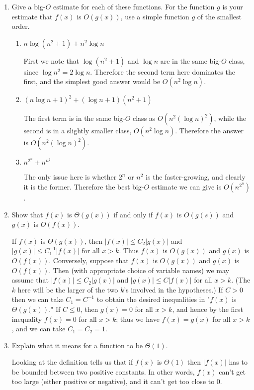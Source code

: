 \documentclass[11pt]{article}
\begin{document}
\begin{enumerate}[label=\textbf{\arabic*.}]
	\item Give a big-$O$ estimate for each of these functions. For the function $g$ is your estimate that $f(x)$ is $O(g(x))$, use a simple function $g$ of the smallest order.
	
	\begin{enumerate}[label=\textbf{\alph*)}]
		\item $n \log(n^2 + 1) + n^2 \log n$
		
		First we note that $\log(n^2 + 1)$ and $\log n$ are in the same big-$O$ class, since $\log n^2 = 2 \log n$. Therefore the second term here dominates the first, and the simplest good answer would be $O(n^2 \log n)$.
		
		\item $(n \log n + 1)^2 + (\log n + 1)(n^2 + 1)$
		
		The first term is in the same big-$O$ class as $O(n^2(\log n)^2)$, while the second is in a slightly smaller class, $O(n^2 \log n)$. Therefore the answer is $O(n^2(\log n)^2)$.
		
		\item $n^{2^n} + n^{n^2}$
		
		The only issue here is whether $2^n$ or $n^2$ is the faster-growing, and clearly it is the former. Therefore the best big-$O$ estimate we can give is $O(n^{2^n})$.
	\end{enumerate}

	\item Show that $f(x)$ is $\Theta(g(x))$ if and only if $f(x)$ is $O(g(s))$ and $g(x)$ is $O(f(x))$.
	
	If $f(x)$ is $\Theta(g(x))$, then $|f(x)| \leq C_2|g(x)|$ and $|g(x)| \leq C_1^{-1}|f(x)|$ for all $x > k$. Thus $f(x)$ is $O(g(x))$ and $g(x)$ is $O(f(x))$. Conversely, suppose that $f(x)$ is $O(g(x))$ and $g(x)$ is $O(f(x))$. Then (with appropriate choice of variable names) we may assume that $|f(x)| \leq C_2|g(x)|$ and $|g(x)| \leq C|f(x)|$ for all $x > k$. (The $k$ here will be the larger of the two $k$'s involved in the hypotheses.) If $C > 0$ then we can take $C_1 = C^{-1}$ to obtain the desired inequalities in "$f(x)$ is $\Theta(g(x))$." If $C \leq 0$, then $g(x) = 0$ for all $x > k$, and hence by the first inequality $f(x) = 0$ for all $x > k$; thus we have $f(x) = g(x)$ for all $x > k$, and we can take $C_1 = C_2 = 1$.
	
	\item Explain what it means for a function to be $\Theta(1)$.
	
	Looking at the definition tells us that if $f(x)$ is $\Theta(1)$ then $|f(x)|$ has to be bounded between two positive constants. In other words, $f(x)$ can't get too large (either positive or negative), and it can't get too close to 0.
\end{enumerate}
\end{document}
